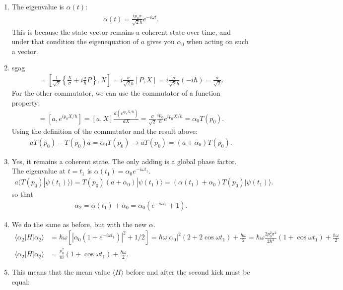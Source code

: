 \documentclass[letterpaper,11pt,twoside]{article}
\newcommand{\ket}[1]{|#1\rangle}
\newcommand{\braket}[1]{\langle#1\rangle}
\begin{document}
\begin{enumerate}[itemsep=0pt,topsep=0pt,label=\alph*)]
  \item The eigenvalue is $\alpha(t)$:
  \begin{align*}
    \alpha(t)=\frac{ip_0\sigma}{\sqrt{2}\hbar}e^{-i\omega t}.
  \end{align*}
  This is because the state vector remains a coherent state over time, and under that condition the eigenequation of $a$ gives you $\alpha_0$ when acting on such a vector.
  \item sgag
  \begin{align*}
    [a,X]=\left[\frac{1}{\sqrt{2}}\left\{\frac{X}{\sigma}+i\frac{\sigma}{\hbar}P\right\},X\right]=i\frac{\sigma}{\sqrt{2}\hbar}[P,X]=i\frac{\sigma}{\sqrt{2}\hbar}(-i\hbar)=\frac{\sigma}{\sqrt{2}}.
  \end{align*}
  For the other commutator, we can use the commutator of a function property:
  \begin{align*}
    [a,T(p_0)]=[a,e^{ip_0X/\hbar}]=[a,X]\frac{d(e^{ip_oX/\hbar})}{dX}=\frac{\sigma}{\sqrt{2}}\frac{ip_0}{\hbar}e^{ip_0X/\hbar}=\alpha_0T(p_0).
  \end{align*}
  Using the definition of the commutator and the result above:
  \begin{align*}
    aT(p_0)-T(p_0)a=\alpha_0T(p_0)\longrightarrow aT(p_0)=(a+\alpha_0)T(p_0).
  \end{align*}
  \item Yes, it remains a coherent state. The only adding is a global phase factor. The eigenvalue at $t=t_1$ is $\alpha(t_1)=\alpha_0e^{-i\omega t_1}$.
  \begin{align*}
    a(T(p_0)\ket{\psi(t_1)})=T(p_0)(a+\alpha_0)\ket{\psi(t_1)}=(\alpha(t_1)+\alpha_0)T(p_0)\ket{\psi(t_1)}.
  \end{align*}
  so that 
  \begin{align*}
    \alpha_2=\alpha(t_1)+\alpha_0=\alpha_0(e^{-i\omega t_1}+1).
  \end{align*}
  \item We do the same as before, but with the new $\alpha$.
  \begin{align*}
    \braket{\alpha_2|H|\alpha_2}&=\hbar\omega\left[|\alpha_0(1+e^{-i\omega t_1})|^2+1/2\right]=\hbar\omega|\alpha_0|^2(2+2\cos\omega t_1)+\frac{\hbar\omega}{2}=\hbar\omega\frac{2p_0^2\sigma^2}{2\hbar^2}(1+\cos\omega t_1)+\frac{\hbar\omega}{2}\\
    \braket{\alpha_2|H|\alpha_2}&=\frac{p_0^2}{m}(1+\cos\omega t_1)+\frac{\hbar\omega}{2}.
  \end{align*}
  \item This means that the mean value $\braket{H}$ before and after the second kick must be equal:

\end{enumerate}
\end{document}
